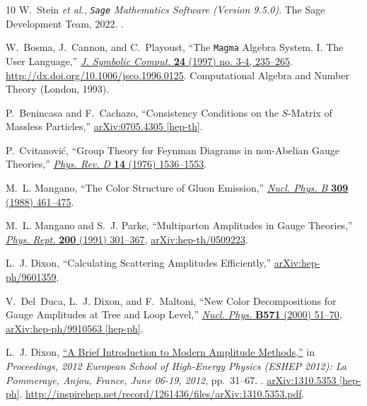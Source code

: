 \documentclass[12pt,a4paper]{article}\let\ifpdf\relax
\begin{document}
\begin{thebibliography}{10}
W.~Stein {\em et al.}, {\em {\texttt{{S}age} {M}athematics {S}oftware
  ({V}ersion 9.5.0)}}.
\newblock The Sage Development Team, 2022.
.

W.~Bosma, J.~Cannon, and C.~Playoust, ``{The \texttt{{M}agma} Algebra System.
  {I}. {T}he User Language},''
  \href{http://dx.doi.org/10.1006/jsco.1996.0125}{{\em J. Symbolic Comput.}
  {\bf 24} (1997) no. 3-4, 235--265}.
  \url{http://dx.doi.org/10.1006/jsco.1996.0125}. Computational Algebra and
  Number Theory (London, 1993).

P.~Benincasa and F.~Cachazo, ``{Consistency Conditions on the $S$-Matrix of
  Massless Particles},''
\href{http://arxiv.org/abs/0705.4305}{{ arXiv:0705.4305 [hep-th]}}.

P.~Cvitanovi\'{c}, ``{Group Theory for Feynman Diagrams in non-Abelian Gauge
  Theories},'' \href{http://dx.doi.org/10.1103/PhysRevD.14.1536}{{\em Phys.
  Rev. D} {\bf 14} (1976)  1536--1553}.

M.~L. Mangano, ``{The Color Structure of Gluon Emission},''
  \href{http://dx.doi.org/10.1016/0550-3213(88)90453-1}{{\em Nucl. Phys. B}
  {\bf 309} (1988)  461--475}.

M.~L. Mangano and S.~J. Parke, ``{Multiparton Amplitudes in Gauge Theories},''
  \href{http://dx.doi.org/10.1016/0370-1573(91)90091-Y}{{\em Phys. Rept.} {\bf
  200} (1991)  301--367}, \href{http://arxiv.org/abs/hep-th/0509223}{{
  arXiv:hep-th/0509223}}.

L.~J. Dixon, ``{Calculating Scattering Amplitudes Efficiently},''
\href{http://arxiv.org/abs/hep-ph/9601359}{{ arXiv:hep-ph/9601359}}.

V.~Del~Duca, L.~J. Dixon, and F.~Maltoni, ``{New Color Decompositions for Gauge
  Amplitudes at Tree and Loop Level},''
  \href{http://dx.doi.org/10.1016/S0550-3213(99)00809-3}{{\em Nucl. Phys.} {\bf
  B571} (2000)  51--70},
\href{http://arxiv.org/abs/hep-ph/9910563}{{ arXiv:hep-ph/9910563 [hep-ph]}}.

L.~J. Dixon, \href{http://dx.doi.org/10.5170/CERN-2014-008.31}{``{A Brief
  Introduction to Modern Amplitude Methods},''} in {\em {Proceedings, 2012
  European School of High-Energy Physics (ESHEP 2012): La Pommeraye, Anjou,
  France, June 06-19, 2012}}, pp.~31--67.
.
\newblock \href{http://arxiv.org/abs/1310.5353}{{ arXiv:1310.5353 [hep-ph]}}.
\newblock
\url{http://inspirehep.net/record/1261436/files/arXiv:1310.5353.pdf}.
\newblock


\end{thebibliography}
\end{document}
